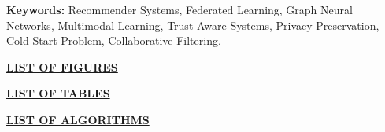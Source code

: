\documentclass[12pt,a4paper]{report}
\begin{document}
{\vspace{0.8cm}
\noindent \textbf{Keywords:} Recommender Systems, Federated Learning, Graph Neural Networks, Multimodal Learning, Trust-Aware Systems, Privacy Preservation, Cold-Start Problem, Collaborative Filtering.

\newpage

\renewcommand{\contentsname}{INDEX}

\renewcommand{\cfttoctitlefont}{\hfil\fontsize{14pt}{16pt}\selectfont\bfseries\underline}
\renewcommand{\cftaftertoctitle}{\hfil}

\renewcommand{\cftbeforetoctitleskip}{-25pt}
\renewcommand{\cftaftertoctitleskip}{20pt}

\renewcommand{\cftchapfont}{\normalfont}
\renewcommand{\cftchappagefont}{\normalfont}
\renewcommand{\cftchapleader}{\cftdotfill{\cftdotsep}}

\tableofcontents
\newpage
\begin{center}
    \textbf{\underline{\fontsize{14pt}{16pt}\selectfont LIST OF FIGURES}}
\end{center}
\vspace{0.5cm}
\makeatletter
{}
\makeatother
{}

\newpage
\begin{center}
    \textbf{\underline{\fontsize{14pt}{16pt}\selectfont LIST OF TABLES}}
\end{center}
\vspace{0.5cm}
\makeatletter
{}
\makeatother
{}

\newpage
\begin{center}
    \textbf{\underline{\fontsize{14pt}{16pt}\selectfont LIST OF ALGORITHMS}}
\end{center}
\vspace{0.5cm}
\makeatletter
{}
\makeatother
{}

\newpage
{} %
\setcounter{page}{1}

\titlespacing*{\chapter}{0pt}{-10pt}{20pt}

}
\end{document}
